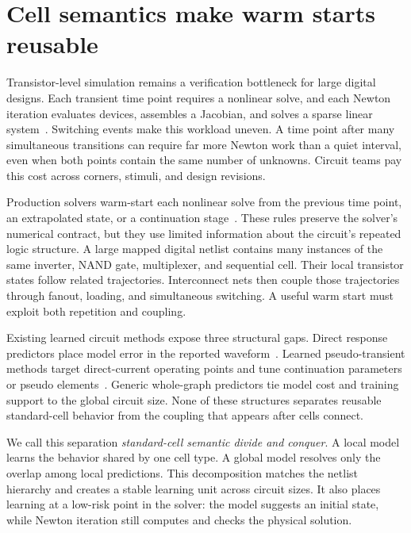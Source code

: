 \section{Cell semantics make warm starts reusable}
\label{sec:introduction}

Transistor-level simulation remains a verification bottleneck for large digital designs. Each transient time point requires a nonlinear solve, and each Newton iteration evaluates devices, assembles a Jacobian, and solves a sparse linear system~\cite{nagel1975spice3,quarles1993spice3}. Switching events make this workload uneven. A time point after many simultaneous transitions can require far more Newton work than a quiet interval, even when both points contain the same number of unknowns. Circuit teams pay this cost across corners, stimuli, and design revisions.

Production \spice{} solvers warm-start each nonlinear solve from the previous time point, an extrapolated state, or a continuation stage~\cite{kundert1990steady,quarles1993spice3}. These rules preserve the solver's numerical contract, but they use limited information about the circuit's repeated logic structure. A large mapped digital netlist contains many instances of the same inverter, NAND gate, multiplexer, and sequential cell. Their local transistor states follow related trajectories. Interconnect nets then couple those trajectories through fanout, loading, and simultaneous switching. A useful warm start must exploit both repetition and coupling.

Existing learned circuit methods expose three structural gaps. Direct response predictors place model error in the reported waveform~\cite{cerny2022deep}. Learned pseudo-transient methods target direct-current operating points and tune continuation parameters or pseudo elements~\cite{xing2022boa,jin2025gpta,jin2025mlpta}. Generic whole-graph predictors tie model cost and training support to the global circuit size. None of these structures separates reusable standard-cell behavior from the coupling that appears after cells connect.

We call this separation \emph{standard-cell semantic divide and conquer}. A local model learns the behavior shared by one cell type. A global model resolves only the overlap among local predictions. This decomposition matches the netlist hierarchy and creates a stable learning unit across circuit sizes. It also places learning at a low-risk point in the solver: the model suggests an initial state, while Newton iteration still computes and checks the physical solution.

